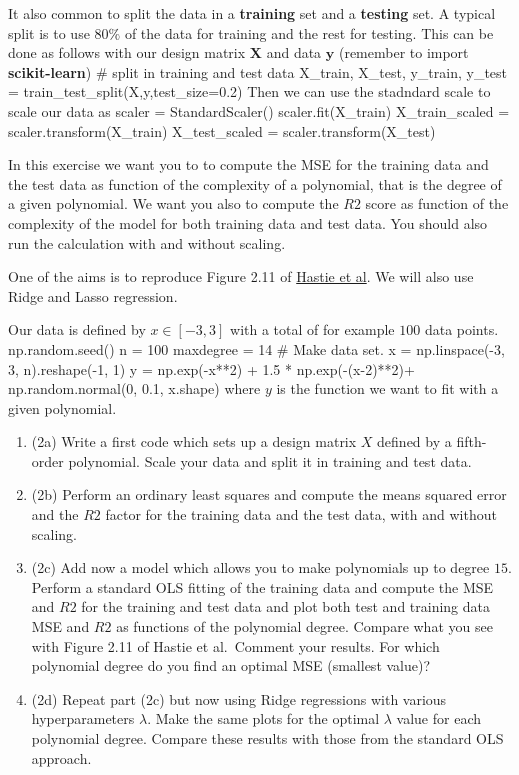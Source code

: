\documentclass[%
oneside,                 %
final,                   %
10pt]{article}
\begin{document}
It also common to split the data in a \textbf{training} set and a \textbf{testing} set. A typical split is to use $80\%$ of the data for training and the rest
for testing. This can be done as follows with our design matrix $\bm{X}$ and data $\bm{y}$ (remember to import \textbf{scikit-learn})
\bpycod
# split in training and test data
X_train, X_test, y_train, y_test = train_test_split(X,y,test_size=0.2)
\epycod
Then we can use the stadndard scale to scale our data as
\bpycod
scaler = StandardScaler()
scaler.fit(X_train)
X_train_scaled = scaler.transform(X_train)
X_test_scaled = scaler.transform(X_test)
\epycod


In this exercise we want you to to compute the MSE for the training
data and the test data as function of the complexity of a polynomial,
that is the degree of a given polynomial. We want you also to compute the $R2$ score as function of the complexity of the model for both training data and test data.  You should also run the calculation with and without scaling. 

One of 
the aims is to reproduce Figure 2.11 of \href{{https://github.com/CompPhysics/MLErasmus/blob/master/doc/Textbooks/elementsstat.pdf}}{Hastie et al}.
We will also use Ridge and Lasso regression. 


Our data is defined by $x\in [-3,3]$ with a total of for example $100$ data points.
\bpycod
np.random.seed()
n = 100
maxdegree = 14
# Make data set.
x = np.linspace(-3, 3, n).reshape(-1, 1)
y = np.exp(-x**2) + 1.5 * np.exp(-(x-2)**2)+ np.random.normal(0, 0.1, x.shape)
\epycod
where $y$ is the function we want to fit with a given polynomial.

\begin{enumerate}
\item (2a) Write a first code which sets up a design matrix $X$ defined by a fifth-order polynomial.  Scale your data and split it in training and test data. 

\item (2b) Perform an ordinary least squares and compute the means squared error and the $R2$ factor for the training data and the test data, with and without scaling.

\item (2c) Add now a model which allows you to make polynomials up to degree $15$.  Perform a standard OLS fitting of the training data and compute the MSE and $R2$ for the training and test data and plot both test and training data MSE and $R2$ as functions of the polynomial degree. Compare what you see with Figure 2.11 of Hastie et al.~Comment your results. For which polynomial degree do you find an optimal MSE (smallest value)?

\item (2d) Repeat part (2c) but now using Ridge regressions with various hyperparameters $\lambda$. Make the same plots for the optimal $\lambda$ value for each polynomial degree. Compare these results with those from the standard OLS approach.
\end{enumerate}
\end{document}
